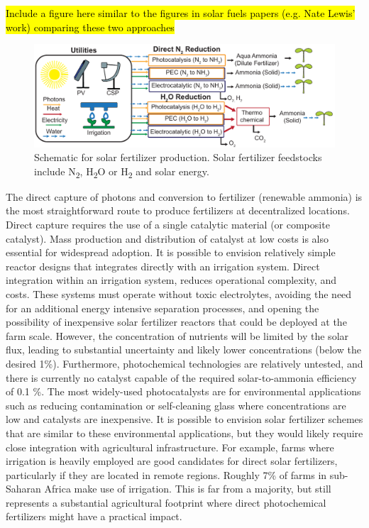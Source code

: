 \hl{Include a figure here similar to the figures in solar fuels papers (e.g. Nate Lewis' work) comparing these two approaches}
\begin{figure}
    \centering
    \includegraphics[width=1\textwidth]{Figures/Reactors.pdf}
    \caption{Schematic for solar fertilizer production. Solar fertilizer feedstocks include N\textsubscript{2}, H\textsubscript{2}O or H\textsubscript{2} and solar energy. }
    \label{fig:reactor}
\end{figure}
The direct capture of photons and conversion to fertilizer (renewable ammonia) is the most straightforward route to produce fertilizers at decentralized locations. Direct capture requires the use of a single catalytic material (or composite catalyst). Mass production and distribution of catalyst at low costs is also essential for widespread adoption. It is possible to envision relatively simple reactor designs that integrates directly with an irrigation system. Direct integration within an irrigation system, reduces operational complexity, and costs. These systems must operate without toxic electrolytes, avoiding the need for an additional energy intensive separation processes, and opening the possibility of inexpensive solar fertilizer reactors that could be deployed at the farm scale. However, the concentration of nutrients will be limited by the solar flux, leading to substantial uncertainty and likely lower concentrations (below the desired 1\%). Furthermore, photochemical technologies are relatively untested, and there is currently no catalyst capable of the required solar-to-ammonia efficiency of 0.1 \%. The most widely-used photocatalysts are for environmental applications such as reducing contamination or self-cleaning glass where concentrations are low and catalysts are inexpensive\cite{Bhatkhande_2001,Parkin_2005}. It is possible to envision solar fertilizer schemes that are similar to these environmental applications, but they would likely require close integration with agricultural infrastructure. For example, farms where irrigation is heavily employed are good candidates for direct solar fertilizers, particularly if they are located in remote regions. Roughly 7\% of farms in sub-Saharan Africa make use of irrigation. This is far from a majority, but still represents a substantial agricultural footprint where direct photochemical fertilizers might have a practical impact. \needcite

